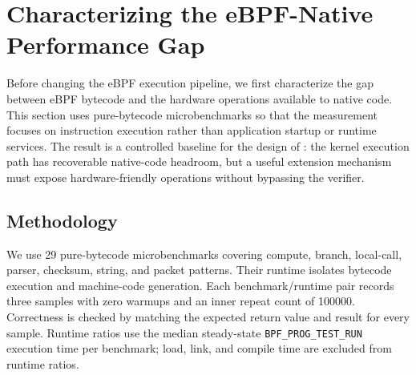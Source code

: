 






\section{Characterizing the eBPF-Native Performance Gap}
\label{sec:characterization}

Before changing the eBPF execution pipeline, we first characterize the gap
between eBPF bytecode and the hardware operations available to native code.
This section uses pure-bytecode microbenchmarks so that the measurement focuses
on instruction execution rather than application startup or runtime services.
The result is a controlled baseline for the design of \lang: the kernel
execution path has recoverable native-code headroom, but a useful extension
mechanism must expose hardware-friendly operations without bypassing the
verifier.

\subsection{Methodology}
\label{subsec:char-methodology}

We use 29 pure-bytecode microbenchmarks covering compute, branch, local-call,
parser, checksum, string, and packet patterns. Their runtime isolates bytecode
execution and machine-code generation. Each benchmark/runtime pair records
three samples with zero warmups and an inner repeat count of 100000.
Correctness is checked by matching the expected return value and result for
every sample. Runtime ratios use the median steady-state
\texttt{BPF\_PROG\_TEST\_RUN} execution time per benchmark; load, link, and
compile time are excluded from runtime ratios.


